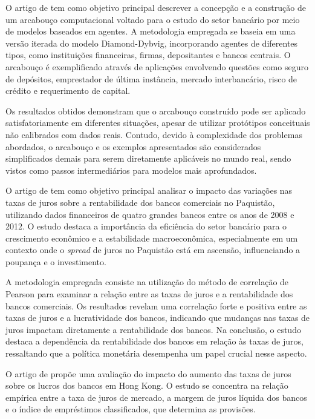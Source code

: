 \documentclass[hidelinks, article,12pt,oneside,a4paper,english,brazil,sumario=tradicional]{abntex2}
\begin{document}
O artigo de  tem como objetivo principal descrever a concepção e a construção de um arcabouço computacional voltado para o estudo do setor bancário por meio de modelos baseados em agentes. A metodologia empregada se baseia em uma versão iterada do modelo Diamond-Dybvig, incorporando agentes de diferentes tipos, como instituições financeiras, firmas, depositantes e bancos centrais. O arcabouço é exemplificado através de aplicações envolvendo questões como seguro de depósitos, emprestador de última instância, mercado interbancário, risco de crédito e requerimento de capital.

Os resultados obtidos demonstram que o arcabouço construído pode ser aplicado satisfatoriamente em diferentes situações, apesar de utilizar protótipos conceituais não calibrados com dados reais. Contudo, devido à complexidade dos problemas abordados, o arcabouço e os exemplos apresentados são considerados simplificados demais para serem diretamente aplicáveis no mundo real, sendo vistos como passos intermediários para modelos mais aprofundados. 


O artigo de  tem como objetivo principal analisar o impacto das variações nas taxas de juros sobre a rentabilidade dos bancos comerciais no Paquistão, utilizando dados financeiros de quatro grandes bancos entre os anos de 2008 e 2012. O estudo destaca a importância da eficiência do setor bancário para o crescimento econômico e a estabilidade macroeconômica, especialmente em um contexto onde o \textit{spread} de juros no Paquistão está em ascensão, influenciando a poupança e o investimento. 

A metodologia empregada consiste na utilização do método de correlação de Pearson para examinar a relação entre as taxas de juros e a rentabilidade dos bancos comerciais. Os resultados revelam uma correlação forte e positiva entre as taxas de juros e a lucratividade dos bancos, indicando que mudanças nas taxas de juros impactam diretamente a rentabilidade dos bancos. Na conclusão, o estudo destaca a dependência da rentabilidade dos bancos em relação às taxas de juros, ressaltando que a política monetária desempenha um papel crucial nesse aspecto. 

O artigo de  propõe uma avaliação do impacto do aumento das taxas de juros sobre os lucros dos bancos em Hong Kong. O estudo se concentra na relação empírica entre a taxa de juros de mercado, a margem de juros líquida dos bancos e o índice de empréstimos classificados, que determina as provisões.
\end{document}
